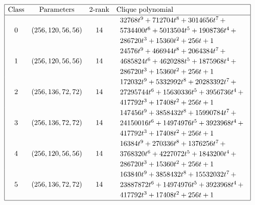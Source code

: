 \begin{table}[!bhpt] %
\small{}
\begin{align*}
\def\arraystretch{1.2}
\begin{array}{|cccl|}
\hline
\text{Class} &
\text{Parameters} &
\text{2-rank} &
\text{Clique polynomial}
\\
\hline
0 &
(256, 120, 56, 56) &
14 &
\begin{array}{l}
32768t^{9} + 712704t^{8} + 3014656t^{7}
\,+
\\
 5734400t^{6} + 5013504t^{5} + 1908736t^{4}
\,+
\\
 286720t^{3} + 15360t^{2} + 256t + 1
\end{array}
\\
1 &
(256, 120, 56, 56) &
14 &
\begin{array}{l}
24576t^{9} + 466944t^{8} + 2064384t^{7}
\,+
\\
 4685824t^{6} + 4620288t^{5} + 1875968t^{4}
\,+
\\
 286720t^{3} + 15360t^{2} + 256t + 1
\end{array}
\\
2 &
(256, 136, 72, 72) &
14 &
\begin{array}{l}
172032t^{9} + 5332992t^{8} + 20283392t^{7}
\,+
\\
 27295744t^{6} + 15630336t^{5} + 3956736t^{4}
\,+
\\
 417792t^{3} + 17408t^{2} + 256t + 1
\end{array}
\\
3 &
(256, 136, 72, 72) &
14 &
\begin{array}{l}
147456t^{9} + 3858432t^{8} + 15990784t^{7}
\,+
\\
 24150016t^{6} + 14974976t^{5} + 3923968t^{4}
\,+
\\
 417792t^{3} + 17408t^{2} + 256t + 1
\end{array}
\\
4 &
(256, 120, 56, 56) &
14 &
\begin{array}{l}
16384t^{9} + 270336t^{8} + 1376256t^{7}
\,+
\\
 3768320t^{6} + 4227072t^{5} + 1843200t^{4}
\,+
\\
 286720t^{3} + 15360t^{2} + 256t + 1
\end{array}
\\
5 &
(256, 136, 72, 72) &
14 &
\begin{array}{l}
163840t^{9} + 3858432t^{8} + 15532032t^{7}
\,+
\\
 23887872t^{6} + 14974976t^{5} + 3923968t^{4}
\,+
\\
 417792t^{3} + 17408t^{2} + 256t + 1
\end{array}
\\
\hline
\end{array}
\end{align*}
\caption{$[f_{8,8}]$ extended Cayley classes.}
\label{tab-c8_8_EC_classes}
\end{table}

